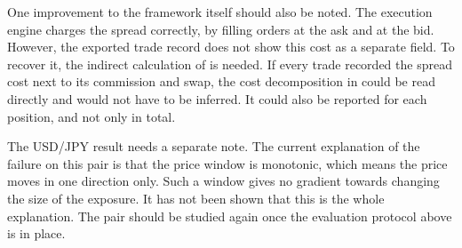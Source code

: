 One improvement to the framework itself should also be noted. The execution engine charges the spread correctly, by filling orders at the ask and at the bid. However, the exported trade record does not show this cost as a separate field. To recover it, the indirect calculation of  is needed. If every trade recorded the spread cost next to its commission and swap, the cost decomposition in  could be read directly and would not have to be inferred. It could also be reported for each position, and not only in total.

The USD/JPY result needs a separate note. The current explanation of the failure on this pair is that the price window is monotonic, which means the price moves in one direction only. Such a window gives no gradient towards changing the size of the exposure. It has not been shown that this is the whole explanation. The pair should be studied again once the evaluation protocol above is in place.